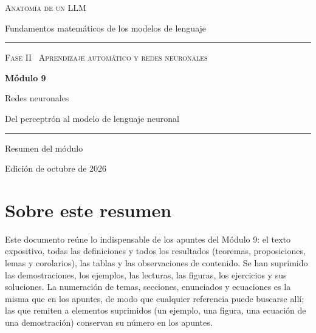 \documentclass[11pt,a4paper,twoside,openany]{book}
\begin{document}
\frontmatter
\begin{titlepage}
\centering
\vspace*{2.5cm}
{\large\scshape Anatomía de un LLM}\par
\vspace{0.4cm}
{\normalsize Fundamentos matemáticos de los modelos de lenguaje}\par
\vspace{2.2cm}
\rule{\textwidth}{0.8pt}\par\vspace{0.5cm}
{\small\scshape Fase II \textperiodcentered\ Aprendizaje automático y redes neuronales}\par\vspace{0.3cm}
{\Huge\bfseries Módulo 9\par}\vspace{0.3cm}
{\LARGE Redes neuronales\par}
\vspace{0.2cm}
{\large Del perceptrón al modelo de lenguaje neuronal\par}
\vspace{0.5cm}\rule{\textwidth}{0.4pt}\par
\vspace{1.6cm}
{\large Resumen del módulo}\par
\vfill
{\small Edición de octubre de 2026}\par
\end{titlepage}

\chapter*{Sobre este resumen}

Este documento reúne lo indispensable de los apuntes del Módulo 9: el texto expositivo, todas las definiciones y todos los resultados (teoremas, proposiciones, lemas y corolarios), las tablas y las observaciones de contenido. Se han suprimido las demostraciones, los ejemplos, las lecturas, las figuras, los ejercicios y sus soluciones. La numeración de temas, secciones, enunciados y ecuaciones es la misma que en los apuntes, de modo que cualquier referencia puede buscarse allí; las que remiten a elementos suprimidos (un ejemplo, una figura, una ecuación de una demostración) conservan su número en los apuntes.
\end{document}
